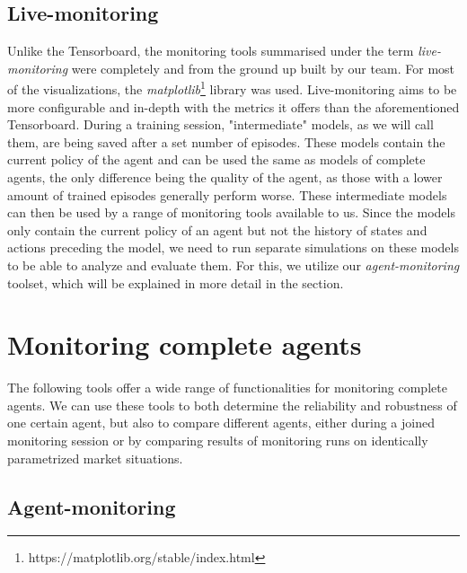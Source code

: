 \subsection{Live-monitoring}

Unlike the Tensorboard, the monitoring tools summarised under the term \emph{live-monitoring} were completely and from the ground up built by our team. For most of the visualizations, the \emph{matplotlib}\footnote[0][-0.2]{https://matplotlib.org/stable/index.html} library was used. Live-monitoring aims to be more configurable and in-depth with the metrics it offers than the aforementioned Tensorboard.  During a training session, "intermediate" models, as we will call them, are being saved after a set number of episodes.  These models contain the current policy of the agent and can be used the same as models of complete agents, the only difference being the quality of the agent, as those with a lower amount of trained episodes generally perform worse.  These intermediate models can then be used by a range of monitoring tools available to us. Since the models only contain the current policy of an agent but not the history of states and actions preceding the model, we need to run separate simulations on these models to be able to analyze and evaluate them. For this, we utilize our \emph{agent-monitoring} toolset, which will be explained in more detail in the  section.

\section{Monitoring complete agents}

The following tools offer a wide range of functionalities for monitoring complete agents. We can use these tools to both determine the reliability and robustness of one certain agent, but also to compare different agents, either during a joined monitoring session or by comparing results of monitoring runs on identically parametrized market situations.

\subsection{Agent-monitoring} \label{subsection:AgentMonitoring}

